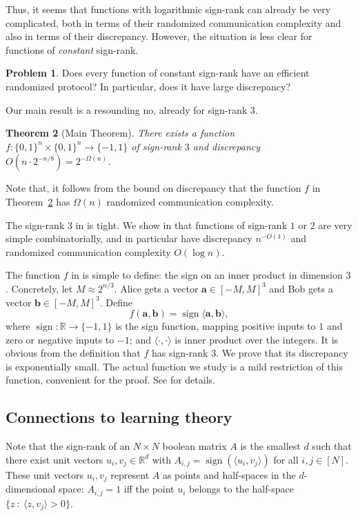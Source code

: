 \documentclass[11pt]{article}
\numberwithin{equation}{section}
\newtheorem{theorem}{Theorem}[section]
\theoremstyle{definition}
\theoremstyle{plain}
\newcommand{\R}{\mathbb R}
\theoremstyle{definition}\newtheorem{problem}[theorem]{Problem}\theoremstyle{plain}
\DeclareMathOperator{\sign}{sign}
\begin{document}
Thus, it seems that functions with logarithmic sign-rank can already be very complicated, both in terms of their randomized communication complexity and also in terms of their discrepancy. However, the situation is less clear for functions of \emph{constant} sign-rank.

\begin{problem}
Does every function of constant sign-rank have an efficient randomized protocol? In particular, does it have large discrepancy?
\end{problem}

Our main result is a resounding no, already for sign-rank $3$.


\begin{theorem}[Main Theorem]\label{thm:main}
There exists a  function $f:\{0,1\}^n \times \{0,1\}^n \to \{-1,1\}$  of sign-rank $3$ and discrepancy $O(n \cdot 2^{-n/8})=2^{-\Omega(n)}$. 
\end{theorem}
Note that, it follows from the bound on discrepancy that the function $f$ in Theorem~\ref{thm:main} has $\Omega(n)$ randomized communication complexity. 

The sign-rank $3$ in  is tight. We show in  that functions of sign-rank $1$ or $2$ are very simple
combinatorially, and in particular have discrepancy $n^{-O(1)}$ and randomized communication complexity $O(\log n)$.

The function $f$ in  is simple to define: the sign on an inner product in dimension $3$. Concretely, let $M \approx 2^{n/3}$. Alice gets a vector $\mathbf{a} \in [-M,M]^3$  and Bob gets a vector $\mathbf{b}  \in [-M,M]^3$.
Define
$$
f(\mathbf{a},\mathbf{b}) = \sign \langle \mathbf{a},\mathbf{b} \rangle,
$$
where $\sign:\R \to \{-1,1\}$ is the sign function, mapping positive inputs to $1$ and zero or negative inputs to $-1$; and $\langle \cdot,\cdot \rangle $ is inner product over the integers.
It is obvious from the definition that $f$ has sign-rank $3$. We prove that its discrepancy is exponentially small.
The actual function we study is a mild restriction of this function, convenient for the proof. See  for details.


\subsection{Connections to learning theory}

Note that the sign-rank of an $N \times N$  boolean matrix  $A$ is the
smallest $d$ such that there exist 
%
%
unit  %
vectors $u_i, v_j\in \R^d$ with $A_{i,j}=\sign(\langle u_i,v_j \rangle)$ for all  $i,j \in [N]$. These unit vectors $u_i,v_j$ represent $A$ as points and half-spaces in the $d$-dimensional space:   $A_{i,j}=1$ iff the point $u_i$ belongs to the half-space $\{z \ : \ \langle z,v_j \rangle > 0 \}$.   
\end{document}
